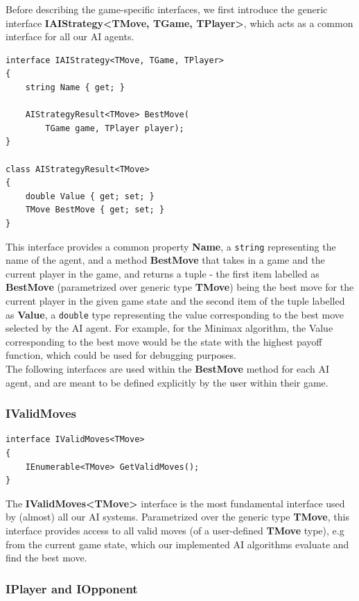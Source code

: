 Before describing the game-specific interfaces, we first introduce the generic interface \textbf{IAIStrategy\textless{}TMove, TGame, TPlayer\textgreater{}}, which acts as a common interface for all our \gls{AI} agents.
\begin{lstlisting}
interface IAIStrategy<TMove, TGame, TPlayer>
{
    string Name { get; }
    
    AIStrategyResult<TMove> BestMove(
        TGame game, TPlayer player);
}

class AIStrategyResult<TMove>
{
    double Value { get; set; }
    TMove BestMove { get; set; }
}
\end{lstlisting}
This interface provides a common property \textbf{Name}, a \texttt{string} representing the name of the agent, and a method \textbf{BestMove} that takes in a game and the current player in the game, and returns a tuple - the first item labelled as \textbf{BestMove} (parametrized over generic type \textbf{TMove}) being the best move for the current player in the given game state and the second item of the tuple labelled as \textbf{Value}, a \texttt{double} type representing the value corresponding to the best move selected by the \gls{AI} agent.
For example, for the Minimax algorithm, the Value corresponding to the best move would be the state with the highest payoff function, which could be used for debugging purposes.
\\
The following interfaces are used within the \textbf{BestMove} method for each \gls{AI} agent, and are meant to be defined explicitly by the user within their game.

\subsubsection{IValidMoves}

\begin{lstlisting}
interface IValidMoves<TMove>
{
    IEnumerable<TMove> GetValidMoves();
}
\end{lstlisting}

The \textbf{IValidMoves\textless{}TMove\textgreater{}} interface is the most fundamental interface used by (almost) all our \gls{AI} systems. Parametrized over the generic type \textbf{TMove}, this interface provides access to all valid moves (of a user-defined \textbf{TMove} type), e.g from the current game state, which our implemented \ac{AI} algorithms evaluate and find the best move.

\subsubsection{IPlayer and IOpponent}

